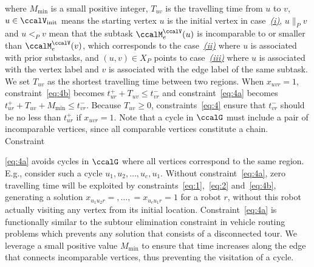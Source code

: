 \documentclass[Afour,sageh,times]{sagej}
\begin{document}
where $M_{\text{min}}$ is a small positive integer, $T_{uv}$ is the travelling time from $u$ to $v$, $u \in \ccalV_{\text{init}}$ means the starting vertex $u$ is the initial vertex in case~\hyperref[sec:a]{{\it (i)}}, $u \|_{P} v$ and $u<_{P} v$ mean that the subtask $\ccalM^\ccalV_{{e}}(u)$ is incomparable to or smaller than $\ccalM^\ccalV_e(v)$, which corresponds to the case~\hyperref[sec:b]{{\it (ii)}} where $u$ is associated with prior substasks, and $(u,v)\in X_P$ points to case~\hyperref[sec:c]{{\it (iii)}} where $u$ is associated with the vertex label and $v$ is associated with the edge label of the same subtask. We set $T_{uv}$ as the shortest travelling time between two regions. When $x_{uvr}=1$, constraint~\eqref{eq:4b} becomes $t_{ur}^+  + T_{uv}  \leq t_{vr}^-$ and constraint~\eqref{eq:4a} becomes $t_{ur}^+  + T_{uv} + M_{\text{min}}   \leq t_{vr}^-$. Because $T_{uv} \geq 0$, constraints~\eqref{eq:4} ensure that $t_{vr}^-$ should be no less than $t_{ur}^+$ if $x_{uvr}=1$. Note that a cycle in $\ccalG$ must include a pair of incomparable vertices, since all comparable vertices constitute a chain. Constraint~{\eqref{eq:4a} avoids cycles in $\ccalG$ where all vertices correspond to the same region. E.g., consider such a cycle $u_1,u_2,\ldots, u_c, u_1$. Without  constraint~\eqref{eq:4a}, zero travelling time will be exploited by constraints~\eqref{eq:1},~\eqref{eq:2} and~\eqref{eq:4b}, generating a solution $x_{u_1 u_2 r} = ,\ldots,=x_{u_c u_{1} r}= 1$ for a robot $r$, without this robot actually visiting any vertex from its initial location.  Constraint~\eqref{eq:4a} is functionally similar to the subtour elimination constraint in vehicle routing problems which prevents any solution that consists of a disconnected tour. We leverage a small positive value $M_{\text{min}}$ to ensure that time increases along the edge that connects incomparable vertices, thus preventing the visitation of a cycle.

}
\end{document}
